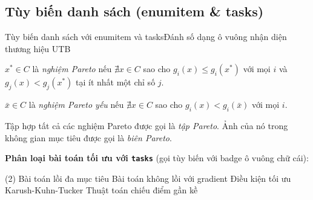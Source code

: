 \documentclass[aspectratio=43,10pt]{beamer}
\begin{document}
\subsection{Tùy biến danh sách (enumitem \& tasks)}
\begin{frame}[t]{Tùy biến danh sách với enumitem và tasks}{Đánh số dạng ô vuông nhận diện thương hiệu UTB}
  \small
  \begin{definition}
    \begin{utbsqlist}
      \item $x^* \in C$ là \emph{nghiệm Pareto} nếu $\nexists x \in C$ sao cho $g_i(x) \le g_i(x^*)$ với mọi $i$ và $g_j(x) < g_j(x^*)$ tại ít nhất một chỉ số $j$. \label{def:pareto}
      \item $\bar{x} \in C$ là \emph{nghiệm Pareto yếu} nếu $\nexists x \in C$ sao cho $g_i(x) < g_i(\bar{x})$ với mọi $i$.
      \item Tập hợp tất cả các nghiệm Pareto được gọi là \emph{tập Pareto}. Ảnh của nó trong không gian mục tiêu được gọi là \emph{biên Pareto}.
    \end{utbsqlist}
  \end{definition}
  \vskip 2pt
  \textbf{Phân loại bài toán tối ưu với \texttt{tasks}} (gọi tùy biến với badge ô vuông chữ cái):
  \begin{tasks}[label=\utbitemsq{\alph*}, label-width=18pt, item-indent=22pt, label-format={\bfseries\color{white}}](2)
    \task Bài toán lồi đa mục tiêu
    \task Bài toán không lồi với gradient
    \task Điều kiện tối ưu Karush-Kuhn-Tucker
    \task Thuật toán chiếu điểm gần kề
  \end{tasks}
\end{frame}
\end{document}

